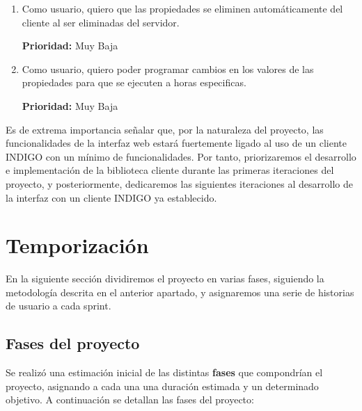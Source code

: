 \begin{enumerate}[label=\textbf{INDIGO.2.\arabic*}, leftmargin=10mm]
	\textbf{Prioridad:} Baja
	\item Como usuario, quiero que las propiedades se eliminen automáticamente del cliente al ser eliminadas del servidor.
	
	\textbf{Prioridad:} Muy Baja
	\item Como usuario, quiero poder programar cambios en los valores de las propiedades para que se ejecuten a horas especificas.
	
	\textbf{Prioridad:} Muy Baja
\end{enumerate}

Es de extrema importancia señalar que, por la naturaleza del proyecto, las funcionalidades de la interfaz web estará fuertemente ligado al uso de un cliente INDIGO con un mínimo de funcionalidades. Por tanto, priorizaremos el desarrollo e implementación de la biblioteca cliente durante las primeras iteraciones del proyecto, y posteriormente, dedicaremos las siguientes iteraciones al desarrollo de la interfaz con un cliente INDIGO ya establecido. 

\section{Temporización}

En la siguiente sección dividiremos el proyecto en varias fases, siguiendo la metodología descrita en el anterior apartado, y asignaremos una serie de historias de usuario a cada sprint.

\subsection{Fases del proyecto}
Se realizó una estimación inicial de las distintas \textbf{fases} que compondrían el proyecto, asignando a cada una una duración estimada y un determinado objetivo. A continuación se detallan las fases del proyecto:

